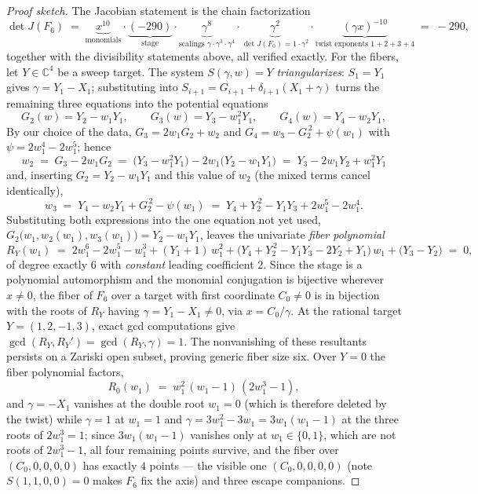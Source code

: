 \documentclass[11pt]{article}
\numberwithin{equation}{section}
\theoremstyle{plain}
\theoremstyle{definition}
\theoremstyle{remark}
\newcommand{\C}{\mathbb{C}}
\begin{document}
\begin{proof}[Proof sketch]
The Jacobian statement is the chain factorization
\[
\det J(F_6)\;=\;
\underbrace{x^{10}}_{\text{monomials}}\cdot
\underbrace{(-290)}_{\text{stage}}\cdot
\underbrace{\gamma^{8}}_{\text{scalings }\gamma\cdot\gamma^3\cdot\gamma^4}\cdot
\underbrace{\gamma^{2}}_{\det J(F_0)=1\cdot\gamma^2}\cdot
\underbrace{(\gamma x)^{-10}}_{\text{twist exponents }1+2+3+4}
\;=\;-290 ,
\]
together with the divisibility statements above, all verified exactly. For the fibers, let
$Y\in\C^4$ be a sweep target. The system $S(\gamma,w)=Y$ \emph{triangularizes}:
$S_1=Y_1$ gives $\gamma=Y_1-X_1$; substituting into
$S_{i+1}=G_{i+1}+\delta_{i+1}(X_1+\gamma)$ turns the remaining three equations
into the potential equations
\[
G_2(w)=Y_2-w_1Y_1,\qquad G_3(w)=Y_3-w_1^2Y_1,\qquad G_4(w)=Y_4-w_2Y_1 ,
\]
By our choice of the data, $G_3=2w_1G_2+w_2$ and
$G_4=w_3-G_2^{\,2}+\psi(w_1)$ with $\psi=2w_1^4-2w_1^5$; hence
\[
w_2\;=\;G_3-2w_1G_2\;=\;\bigl(Y_3-w_1^2Y_1\bigr)-2w_1\bigl(Y_2-w_1Y_1\bigr)
\;=\;Y_3-2w_1Y_2+w_1^2Y_1
\]
and, inserting $G_2=Y_2-w_1Y_1$ and this value of $w_2$ (the mixed terms
cancel identically),
\[
w_3\;=\;Y_4-w_2Y_1+G_2^{\,2}-\psi(w_1)
\;=\;Y_4+Y_2^{\,2}-Y_1Y_3+2w_1^5-2w_1^4 .
\]
Substituting both expressions into the one equation not yet used,
$G_2\bigl(w_1,w_2(w_1),w_3(w_1)\bigr)=Y_2-w_1Y_1$, leaves the univariate \emph{fiber polynomial}
\[
R_Y(w_1)\;=\;2w_1^6-2w_1^5-w_1^3+(Y_1+1)\,w_1^2
+\bigl(Y_4+Y_2^{\,2}-Y_1Y_3-2Y_2+Y_1\bigr)\,w_1+\bigl(Y_3-Y_2\bigr)\;=\;0 ,
\]
of degree exactly $6$ with \emph{constant} leading coefficient $2$. Since the
stage is a polynomial automorphism and the monomial conjugation is bijective
wherever $x\neq0$, the fiber of $F_6$ over a target with first coordinate
$C_0\neq0$ is in bijection with the roots of $R_Y$ having $\gamma=Y_1-X_1\neq0$,
via $x=C_0/\gamma$. At the rational target $Y=(1,2,-1,3)$, exact gcd computations give
$\gcd(R_Y,R_Y')=\gcd(R_Y,\gamma)=1$. The nonvanishing of these resultants
persists on a Zariski open subset, proving generic fiber size six.
Over
$Y=0$ the fiber polynomial factors,
\[
R_0(w_1)\;=\;w_1^2\,(w_1-1)\,(2w_1^3-1),
\]
and $\gamma=-X_1$ vanishes at the double root $w_1=0$ (which is therefore
deleted by the twist) while $\gamma=1$ at $w_1=1$ and
$\gamma=3w_1^2-3w_1=3w_1(w_1-1)$ at the three roots of $2w_1^3=1$; since
$3w_1(w_1-1)$ vanishes only at $w_1\in\{0,1\}$, which are not roots of
$2w_1^3-1$, all four remaining points survive, and the fiber over
$(C_0,0,0,0,0)$ has exactly $4$ points --- the visible one
$(C_0,0,0,0,0)$ (note $S(1,1,0,0)=0$ makes $F_6$ fix the axis) and three
escape companions.
\end{proof}
\end{document}
